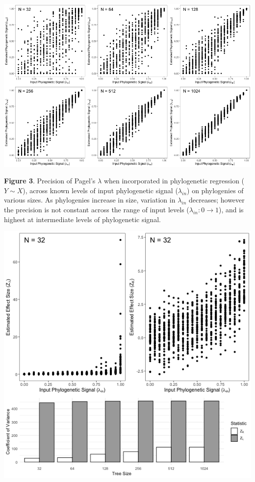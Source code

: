 \documentclass[
]{article}
\begin{document}
\includegraphics[width=0.95\linewidth]{Fig3}

\singlespacing \textbf{Figure 3}. Precision of Pagel's \(\lambda\) when
incorporated in phylogenetic regression (\(Y\sim X\)), across known
levels of input phylogenetic signal (\(\lambda_{in}\)) on phylogenies of
various sizes. As phylogenies increase in size, variation in
\(\lambda_{in}\) decreases; however the precision is not constant across
the range of input levels (\(\lambda_{in}: 0 \to 1\)), and is highest at
intermediate levels of phylogenetic signal.

\newpage

\includegraphics[width=0.95\linewidth]{Fig4}
\end{document}
